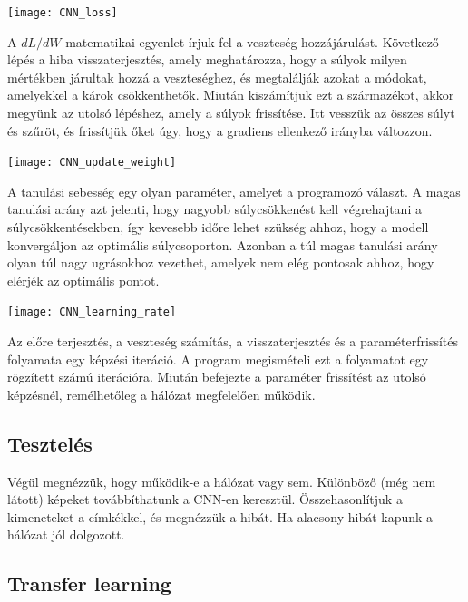 \begin{center}
\texttt{[image: CNN\_loss]}
\end{center}

A $dL/dW$ matematikai egyenlet írjuk fel a veszteség hozzájárulást. Következő lépés a hiba visszaterjesztés, amely meghatározza, hogy a súlyok milyen mértékben járultak hozzá a veszteséghez, és megtalálják azokat a módokat, amelyekkel a károk csökkenthetők. Miután kiszámítjuk ezt a származékot, akkor megyünk az utolsó lépéshez, amely a súlyok frissítése. Itt vesszük az összes súlyt és szűröt, és frissítjük őket úgy, hogy a gradiens ellenkező irányba változzon.

\begin{center}
\texttt{[image: CNN\_update\_weight]}
\end{center}

A tanulási sebesség egy olyan paraméter, amelyet a programozó választ. A magas tanulási arány azt jelenti, hogy nagyobb súlycsökkenést kell végrehajtani a súlycsökkentésekben, így kevesebb időre lehet szükség ahhoz, hogy a modell konvergáljon az optimális súlycsoporton. Azonban a túl magas tanulási arány olyan túl nagy ugrásokhoz vezethet, amelyek nem elég pontosak ahhoz, hogy elérjék az optimális pontot.

\begin{center}
\texttt{[image: CNN\_learning\_rate]}
\end{center}

Az előre terjesztés, a veszteség számítás, a visszaterjesztés és a paraméterfrissítés folyamata egy képzési iteráció. A program megismételi ezt a folyamatot egy rögzített számú iterációra. Miután befejezte a paraméter frissítést az utolsó képzésnél, remélhetőleg a hálózat megfelelően működik.

\subsection{Tesztelés}

Végül megnézzük, hogy működik-e a hálózat vagy sem. Különböző (még nem látott) képeket továbbíthatunk a CNN-en keresztül. Összehasonlítjuk a kimeneteket a címkékkel, és megnézzük a hibát. Ha alacsony hibát kapunk a hálózat jól dolgozott.

\subsection{Transfer learning}

